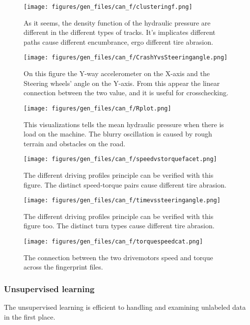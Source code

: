 		\begin{figure}[H]
			\centering
			\texttt{[image: figures/gen\_files/can\_f/clusteringf.png]}
			\caption{As it seems, the density function of the hydraulic pressure are different in the different types of tracks. It's implicates different paths cause different encumbrance, ergo different tire abrasion.} 
			\end{figure}
		\begin{figure}[H]
			\centering
			\texttt{[image: figures/gen\_files/can\_f/CrashYvsSteeringangle.png]}
			\caption{On this figure the Y-way accelerometer on the X-axis and the Steering wheels' angle on the Y-axis. From this appear the linear connection between the two value, and it is useful for crosschecking.} 
			\end{figure}
		\begin{figure}[H]
			\centering
			\texttt{[image: figures/gen\_files/can\_f/Rplot.png]}
			\caption{This visualizations tells the mean hydraulic pressure when there is load on the machine. The blurry oscillation is caused by rough terrain and obstacles on the road.} 
			\end{figure}		
		\begin{figure}[H]
			\centering
			\texttt{[image: figures/gen\_files/can\_f/speedvstorquefacet.png]}
			\caption{The different driving profiles principle can be verified with this figure. The distinct speed-torque pairs cause different tire abrasion.} 
			\end{figure}	
		\begin{figure}[H]
			\centering
			\texttt{[image: figures/gen\_files/can\_f/timevssteeringangle.png]}
			\caption{The different driving profiles principle can be verified with this figure too. The distinct turn types cause different tire abrasion.} 
			\end{figure}	
		\begin{figure}[H]
			\centering
			\texttt{[image: figures/gen\_files/can\_f/torquespeedcat.png]}
			\caption{The connection between the two drivemotors speed and torque across the fingerprint files.} 
			\end{figure}		
	\subsubsection{Unsupervised learning}
	The unsupervised learning is efficient to handling and examining unlabeled data in the first place.
	
